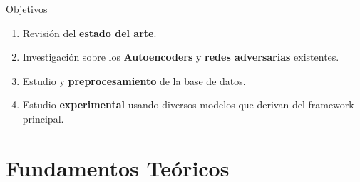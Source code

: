 \documentclass[aspectratio=43]{beamer}
\renewcommand{\cite}[1]{\footnote<.->[frame]{\fullcite{#1}}}
\newcommand{\absimage}[4][0.5,0.5]{%
	\begin{textblock}{#3}%
		[#1]%
		(#2)%
		\texttt{[image: \#4]}%
\end{textblock}}
\begin{document}
\begin{frame}{Objetivos}
  \begin{enumerate}
    \item Revisión del \textbf{estado del arte}.
    \item Investigación sobre los \textbf{Autoencoders} y \textbf{redes adversarias} existentes.
    \item Estudio y \textbf{preprocesamiento} de la base de datos.
    \item Estudio \textbf{experimental} usando diversos modelos que derivan del framework principal.
  \end{enumerate}
\end{frame}

\section{Fundamentos Teóricos}



\end{document}
